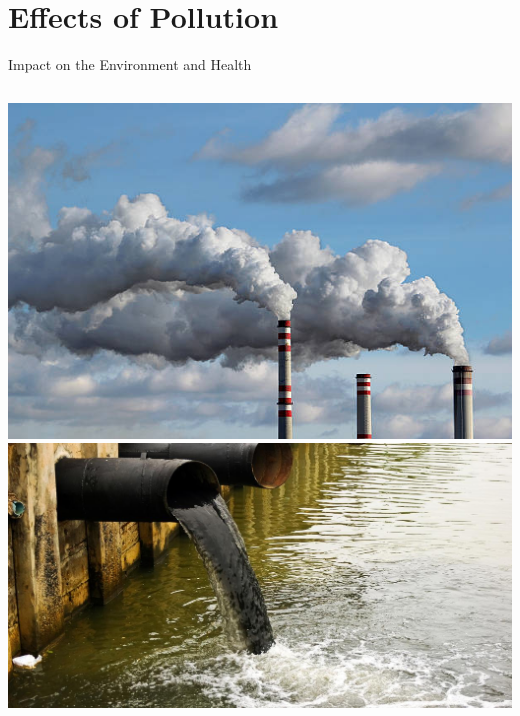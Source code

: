 \documentclass{beamer}
\begin{document}
\section{Effects of Pollution}
\begin{frame}{Impact on the Environment and Health}
  \begin{columns}
    \includegraphics[width=\textwidth]{images/air-pollution.png}
    \includegraphics[width=\textwidth]{images/water-pollution.png}
  \end{columns}


\end{frame}
\end{document}
